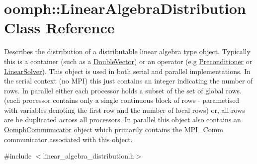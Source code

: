 \hypertarget{classoomph_1_1LinearAlgebraDistribution}{}\section{oomph\+:\+:Linear\+Algebra\+Distribution Class Reference}
\label{classoomph_1_1LinearAlgebraDistribution}


Describes the distribution of a distributable linear algebra type object. Typically this is a container (such as a \hyperlink{classoomph_1_1DoubleVector}{Double\+Vector}) or an operator (e.\+g \hyperlink{classoomph_1_1Preconditioner}{Preconditioner} or \hyperlink{classoomph_1_1LinearSolver}{Linear\+Solver}). This object is used in both serial and parallel implementations. In the serial context (no M\+PI) this just contains an integer indicating the number of rows. In parallel either each processor holds a subset of the set of global rows. (each processor contains only a single continuous block of rows -\/ parametised with variables denoting the first row and the number of local rows) or, all rows are be duplicated across all processors. In parallel this object also contains an \hyperlink{classoomph_1_1OomphCommunicator}{Oomph\+Communicator} object which primarily contains the M\+P\+I\+\_\+\+Comm communicator associated with this object.  




{\ttfamily \#include $<$linear\+\_\+algebra\+\_\+distribution.\+h$>$}

